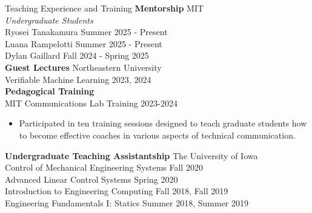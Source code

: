 \begin{rSection}{Teaching Experience and Training}
    {\bf Mentorship} \hfill MIT\\
    \textit{Undergraduate Students}\\
    Ryosei Tanakamura \hfill Summer 2025 - Present\\
    Luana Rampelotti \hfill Summer 2025 - Present\\
    Dylan Gaillard \hfill Fall 2024 - Spring 2025\\

    {\bf Guest Lectures} \hfill Northeastern University\\
    Verifiable Machine Learning \hfill 2023, 2024\\

    {\bf Pedagogical Training}\\
    MIT Communications Lab Training \hfill 2023-2024
    \begin{itemize}
        \item Participated in ten training sessions designed to teach graduate students how to become effective coaches in various aspects of technical communication.
    \end{itemize}

    {\bf Undergraduate Teaching Assistantship} \hfill The University of Iowa\\
    Control of Mechanical Engineering Systems \hfill Fall 2020\\
    Advanced Linear Control Systems \hfill Spring 2020\\
    Introduction to Engineering Computing \hfill Fall 2018, Fall 2019\\
    Engineering Fundamentals I: Statics \hfill Summer 2018, Summer 2019\\

\end{rSection}